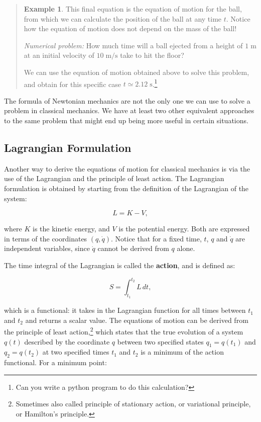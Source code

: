\documentclass[
  9pt,
]{extbook}
\theoremstyle{definition}
\theoremstyle{definition}
\newtheorem{example}{Example}[chapter]
\theoremstyle{definition}
\theoremstyle{remark}
\begin{document}
\begin{quote}
\begin{example}
This final equation is the equation of motion for the ball, from which we can calculate the position of the ball at any time \(t\). Notice how the equation of motion does not depend on the mass of the ball!

\emph{Numerical problem:} How much time will a ball ejected from a height of \(1 \;\mathrm{m}\) at an initial velocity of \(10 \;\mathrm{m/s}\) take to hit the floor?

We can use the equation of motion obtained above to solve this problem, and obtain for this specific case \(t\simeq2.12\;\mathrm{s}\).\footnote{Can you write a python program to do this calculation?}
\end{example}
\end{quote}

The formula of Newtonian mechanics are not the only one we can use to solve a problem in classical mechanics. We have at least two other equivalent approaches to the same problem that might end up being more useful in certain situations.

\hypertarget{lagrangian-formulation}{%
\subsection{Lagrangian Formulation}\label{lagrangian-formulation}}

Another way to derive the equations of motion for classical mechanics is via the use of the Lagrangian and the principle of least action. The Lagrangian formulation is obtained by starting from the definition of the Lagrangian of the system:

\begin{equation}
L = K - V,
\label{eq:lag1}
\end{equation}

where \(K\) is the kinetic energy, and \(V\) is the potential energy. Both are expressed in terms of the coordinates \((q,\dot{q})\). Notice that for a fixed time, \(t\), \(q\) and \(\dot{q}\) are independent variables, since \(\dot{q}\) cannot be derived from \(q\) alone.

The time integral of the Lagrangian is called the \textbf{action}, and is defined as:

\begin{equation}
S = \int_{t_1}^{t_2} L\, dt,
\label{eq:lag2}
\end{equation}

which is a functional: it takes in the Lagrangian function for all times between \(t_1\) and \(t_2\) and returns a scalar value. The equations of motion can be derived from the principle of least action,\footnote{Sometimes also called principle of stationary action, or variational principle, or Hamilton's principle.} which states that the true evolution of a system \(q(t)\) described by the coordinate \(q\) between two specified states \(q_1 = q(t_1)\) and \(q_2 = q(t_2)\) at two specified times \(t_1\) and \(t_2\) is a minimum of the action functional. For a minimum point:
\end{document}
